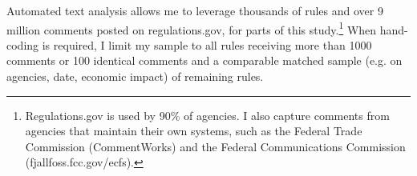 Automated text analysis allows me to leverage thousands of rules and over 9 million comments posted on regulations.gov, for parts of this study.\footnote{Regulations.gov is used by 90\% of agencies. I also capture comments from agencies that maintain their own systems, such as the Federal Trade Commission (CommentWorks) and the Federal Communications Commission (fjallfoss.fcc.gov/ecfs).} When hand-coding is required, I limit my sample to all rules receiving more than 1000 comments or 100 identical comments and a comparable matched sample (e.g. on agencies, date, economic impact) of remaining rules. %





